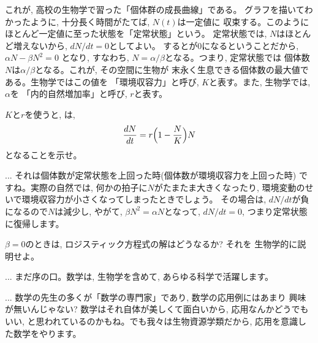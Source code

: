 これが, 高校の生物学で習った「個体群の成長曲線」である。
グラフを描いてわかったように, 十分長く時間がたてば, $N(t)$は一定値に
収束する。このようにほとんど一定値に至った状態を「定常状態」という。
定常状態では, $N$はほとんど増えないから, $dN/dt=0$としてよい。
するとが0になるということだから, $\alpha N-\beta N^2=0$
となり, すなわち, $N=\alpha/\beta$となる。つまり, 定常状態では
個体数$N$は$\alpha/\beta$となる。これが, その空間に生物が
末永く生息できる個体数の最大値である。生物学ではこの値を
「環境収容力」と呼び, 
$K$と表す。また, 生物学では, $\alpha$を
「内的自然増加率」と呼び, $r$と表す。

\begin{q}\label{q:Logistic_biology}
$K$と$r$を使うと, は, 
\begin{eqnarray}
\frac{dN}{dt}=r\Bigl(1-\frac{N}{K}\Bigr)N\label{eq:logistic_bio}
\end{eqnarray}
となることを示せ。\end{q}

\begin{faq}{\small{}
... それは個体数が定常状態を上回った時(個体数が環境収容力を上回った時)
ですね。実際の自然では, 何かの拍子に$N$がたまたま大きくなったり, 
環境変動のせいで環境収容力が小さくなってしまったときでしょう。
その場合は, $dN/dt$が負になるので$N$は減少し, やがて, 
$\beta N^2 = \alpha N$となって, $dN/dt = 0$, 
つまり定常状態に復帰します。}\end{faq}
\mv

\begin{q}\label{q:Logistic_nofight}
$\beta=0$のときは, ロジスティック方程式の解はどうなるか? それを
生物学的に説明せよ。
\end{q}
\mv

\begin{faq}{\small{}
... まだ序の口。数学は, 生物学を含めて, あらゆる科学で活躍します。}\end{faq}

\begin{faq}{\small{}
... 数学の先生の多くが「数学の専門家」であり, 数学の応用例にはあまり
興味が無いんじゃない? 数学はそれ自体が美しくて面白いから, 
応用なんかどうでもいい, と思われているのかもね。でも我々は生物資源学類だから, 
応用を意識した数学をやります。}\end{faq}

